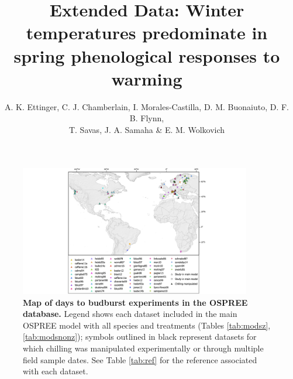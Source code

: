 \documentclass{article}
\begin{document}

\title{Extended Data:  Winter temperatures predominate in spring phenological responses to warming} 

\author{A. K. Ettinger, C. J. Chamberlain, I. Morales-Castilla, D. M. Buonaiuto, D. F. B. Flynn, \\ T. Savas, J. A. Samaha \& E. M. Wolkovich}
\date{} 
\maketitle  
\renewcommand{\thefigure}{ED\arabic{figure}}


\begin{figure}[h!]
\centering
\noindent \includegraphics[width=0.9\textwidth]{..//..//analyses/bb_analysis/figures/EDFig1_OSPREECOORDSwcoords.png}
\caption{\textbf{Map of days to budburst experiments in the OSPREE database.} Legend shows each dataset included in the main OSPREE model with all species and treatments (Tables \ref{tab:modsz}, \ref{tab:modsnonz}); symbols outlined in black represent datasets for which chilling was manipulated experimentally or through multiple field sample dates. See Table \ref{tab:ref} for the reference associated with each dataset.}
\label{fig:map}
\end{figure}
\end{document}
